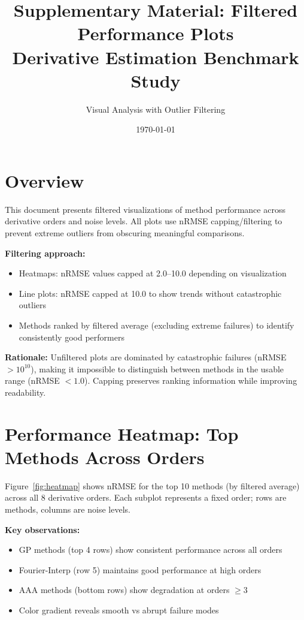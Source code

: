 \documentclass[11pt]{article}
\title{Supplementary Material: Filtered Performance Plots\\
Derivative Estimation Benchmark Study}
\author{Visual Analysis with Outlier Filtering}
\date{\today}
\begin{document}
\maketitle

\section*{Overview}

This document presents filtered visualizations of method performance across derivative orders and noise levels. All plots use nRMSE capping/filtering to prevent extreme outliers from obscuring meaningful comparisons.

\textbf{Filtering approach:}
\begin{itemize}
    \item Heatmaps: nRMSE values capped at 2.0--10.0 depending on visualization
    \item Line plots: nRMSE capped at 10.0 to show trends without catastrophic outliers
    \item Methods ranked by filtered average (excluding extreme failures) to identify consistently good performers
\end{itemize}

\textbf{Rationale:} Unfiltered plots are dominated by catastrophic failures (nRMSE $> 10^{10}$), making it impossible to distinguish between methods in the usable range (nRMSE $< 1.0$). Capping preserves ranking information while improving readability.

\clearpage


\section{Performance Heatmap: Top Methods Across Orders}

Figure~\ref{fig:heatmap} shows nRMSE for the top 10 methods (by filtered average) across all 8 derivative orders. Each subplot represents a fixed order; rows are methods, columns are noise levels.

\textbf{Key observations:}
\begin{itemize}
    \item GP methods (top 4 rows) show consistent performance across all orders
    \item Fourier-Interp (row 5) maintains good performance at high orders
    \item AAA methods (bottom rows) show degradation at orders $\geq 3$
    \item Color gradient reveals smooth vs abrupt failure modes
\end{itemize}
\end{document}
